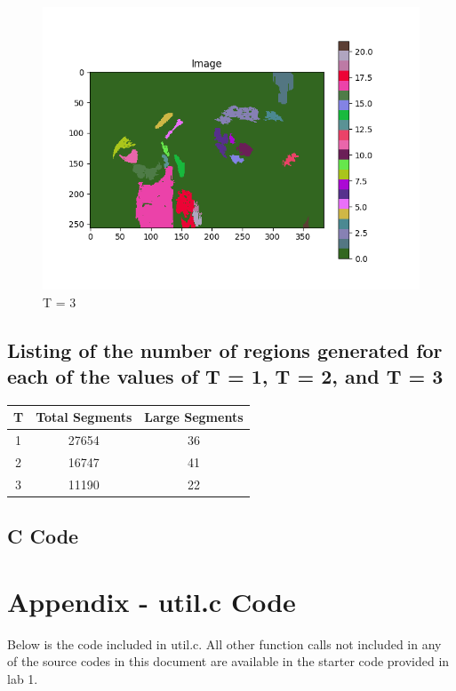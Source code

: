 \documentclass{article}
\begin{document}
\begin{figure}[H]
    \centering
    \includegraphics[width=1\textwidth]{../segmentation-3t-contrasted.png}
    \caption{T = 3}
    \begin{center}
    \end{center}
\end{figure}

\subsection{Listing of the number of regions generated for each of the values of T = 1, T = 2, and T = 3}
\begin{center}
    \begin{tabular}{|c|c|c|}
        \hline
        T & Total Segments & Large Segments \\
        \hline
        1 & 27654 & 36 \\
        \hline
        2 & 16747 & 41 \\
        \hline
        3 & 11190 & 22 \\
        \hline
    \end{tabular}
\end{center}

\subsection{C Code}




\section{Appendix - util.c Code}
Below is the code included in util.c. All other function calls not included in any of the source codes in this document are available in the starter code provided in lab 1.

\end{document}
